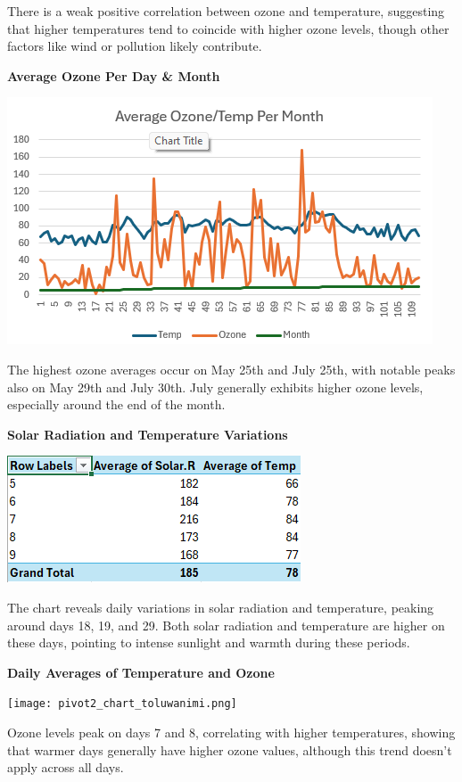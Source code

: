 \documentclass[
  letterpaper,
  DIV=11,
  numbers=noendperiod]{scrreprt}
\begin{document}
There is a weak positive correlation between ozone and temperature,
suggesting that higher temperatures tend to coincide with higher ozone
levels, though other factors like wind or pollution likely contribute.

\textbf{Average Ozone Per Day \& Month}

\includegraphics{pivot4_table_toluwanimi.png}

The highest ozone averages occur on May 25th and July 25th, with notable
peaks also on May 29th and July 30th. July generally exhibits higher
ozone levels, especially around the end of the month.

\textbf{Solar Radiation and Temperature Variations}

\includegraphics{pivot1_chart_toluwanimi.png}

The chart reveals daily variations in solar radiation and temperature,
peaking around days 18, 19, and 29. Both solar radiation and temperature
are higher on these days, pointing to intense sunlight and warmth during
these periods.

\textbf{Daily Averages of Temperature and Ozone}

\texttt{[image: pivot2\_chart\_toluwanimi.png]}

Ozone levels peak on days 7 and 8, correlating with higher temperatures,
showing that warmer days generally have higher ozone values, although
this trend doesn't apply across all days.
\end{document}
